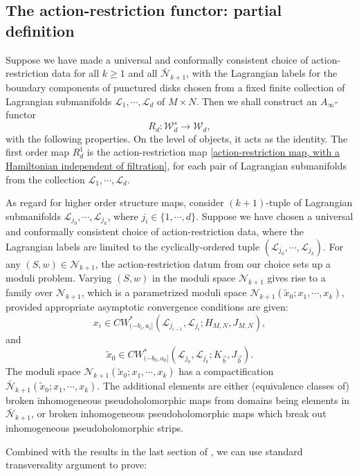 \documentclass{amsart}
\numberwithin{equation}{section}
\numberwithin{figure}{section}
\begin{document}
\subsection{The action-restriction functor: partial definition}
	Suppose we have made a universal and conformally consistent choice of action-restriction data for all $k \ge 1$ and all $\bar{\mathcal{N}}_{k+1}$, with the Lagrangian labels for the boundary components of punctured disks chosen from a fixed finite collection of Lagrangian submanifolds $\mathcal{L}_{1}, \cdots, \mathcal{L}_{d}$ of $M \times N$. Then we shall construct an $A_{\infty}$-functor
\begin{equation} \label{action-restriction functor for finitely many Lagrangians}
R_{d}: \mathcal{W}^{s}_{d} \to \mathcal{W}_{d},
\end{equation}
with the following properties. On the level of objects, it acts as the identity. The first order map $R_{d}^{1}$ is the action-restriction map \eqref{action-restriction map, with a Hamiltonian independent of filtration}, for each pair of Lagrangian submanifolds from the collection $\mathcal{L}_{1}, \cdots, \mathcal{L}_{d}$. \par
	As regard for higher order structure maps, consider $(k+1)$-tuple of Lagrangian submanifolds $\mathcal{L}_{j_{0}}, \cdots, \mathcal{L}_{j_{k}}$, where $j_{i} \in \{1, \cdots, d\}$. Suppose we have chosen a universal and conformally consistent choice of action-restriction data, where the Lagrangian labels are limited to the cyclically-ordered tuple $(\mathcal{L}_{j_{0}}, \cdots, \mathcal{L}_{j_{k}})$. For any $(S, w) \in \mathcal{N}_{k+1}$, the action-restriction datum from our choice sets up a moduli problem. Varying $(S, w)$ in the moduli space $\mathcal{N}_{k+1}$ gives rise to a family over $\mathcal{N}_{k+1}$, which is a parametrized moduli space $\mathcal{N}_{k+1}(\tilde{x}_{0}; x_{1}, \cdots, x_{k})$, provided appropriate asymptotic convergence conditions are given:
\begin{equation*}
x_{i} \in CW^{*}_{(-b_{i}, a_{i}]}(\mathcal{L}_{j_{i-1}}, \mathcal{L}_{j_{i}}; H_{M, N}, J_{M, N}),
\end{equation*}
and
\begin{equation*}
\tilde{x}_{0} \in CW^{*}_{(-b_{0}, a_{0}]}(\mathcal{L}_{j_{0}}, \mathcal{L}_{j_{k}}; K_{\vec{b}}, J_{\vec{b}}).
\end{equation*}
The moduli space $\mathcal{N}_{k+1}(\tilde{x}_{0}; x_{1}, \cdots, x_{k})$ has a compactification $\bar{\mathcal{N}}_{k+1}(\tilde{x}_{0}; x_{1}, \cdots, x_{k})$. The additional elements are either (equivalence classes of) broken inhomogeneous pseudoholomorphic maps from domains being elements in $\bar{\mathcal{N}}_{k+1}$, or broken inhomogeneous pseudoholomorphic maps which break out inhomogeneous pseudoholomorphic strips. \par
	Combined with the results in the last section of \cite{Gao1}, we can use standard transversality argument to prove: \par
\end{document}
